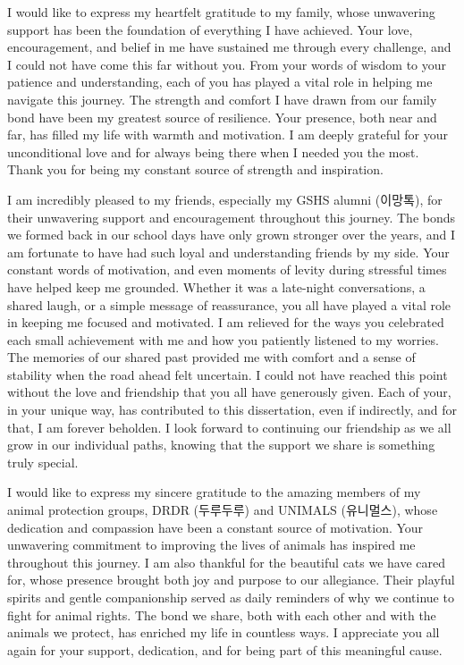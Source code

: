 \documentclass[11pt, a4paper, onecolumn, oneside]{report}
\begin{document}
        I would like to express my heartfelt gratitude to my family, whose unwavering support has been the foundation of everything I have achieved. Your love, encouragement, and belief in me have sustained me through every challenge, and I could not have come this far without you. From your words of wisdom to your patience and understanding, each of you has played a vital role in helping me navigate this journey. The strength and comfort I have drawn from our family bond have been my greatest source of resilience. Your presence, both near and far, has filled my life with warmth and motivation. I am deeply grateful for your unconditional love and for always being there when I needed you the most. Thank you for being my constant source of strength and inspiration.

        I am incredibly pleased to my friends, especially my GSHS alumni (이망톡), for their unwavering support and encouragement throughout this journey. The bonds we formed back in our school days have only grown stronger over the years, and I am fortunate to have had such loyal and understanding friends by my side. Your constant words of motivation, and even moments of levity during stressful times have helped keep me grounded. Whether it was a late-night conversations, a shared laugh, or a simple message of reassurance, you all have played a vital role in keeping me focused and motivated. I am relieved for the ways you celebrated each small achievement with me and how you patiently listened to my worries. The memories of our shared past provided me with comfort and a sense of stability when the road ahead felt uncertain. I could not have reached this point without the love and friendship that you all have generously given. Each of your, in your unique way, has contributed to this dissertation, even if indirectly, and for that, I am forever beholden. I look forward to continuing our friendship as we all grow in our individual paths, knowing that the support we share is something truly special.

        I would like to express my sincere gratitude to the amazing members of my animal protection groups, DRDR (두루두루) and UNIMALS (유니멀스), whose dedication and compassion have been a constant source of motivation. Your unwavering commitment to improving the lives of animals has inspired me throughout this journey. I am also thankful for the beautiful cats we have cared for, whose presence brought both joy and purpose to our allegiance. Their playful spirits and gentle companionship served as daily reminders of why we continue to fight for animal rights. The bond we share, both with each other and with the animals we protect, has enriched my life in countless ways. I appreciate you all again for your support, dedication, and for being part of this meaningful cause.
\end{document}
